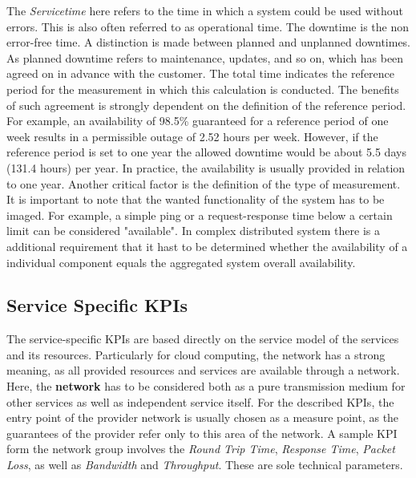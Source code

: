  The \textit{Servicetime} here refers to the time in which a system could be used without errors. This is also often referred to as operational time. The downtime is the non  error-free  time. A distinction is made between planned and unplanned downtimes. As planned downtime refers to maintenance, updates, and so on, which has been agreed on in advance with the customer. The total time indicates the reference period for the measurement in which this calculation is conducted.  The benefits of such agreement is strongly dependent on the definition of the reference period. For example, an availability of 98.5\% guaranteed for a reference period of one week results in a permissible outage of 2.52 hours per week. However, if the reference period is set to one year the allowed downtime would be about 5.5 days (131.4 hours) per year. In practice, the availability is usually provided in relation to one year.  Another critical factor is the definition of the type of measurement. It is important to note that the wanted functionality of the system has to be imaged. For example, a simple ping or a request-response time below a certain limit can be considered "available".  In complex distributed system there is a additional requirement that it hast to be determined whether the availability of a individual component equals the aggregated system overall availability.
 
\subsection{Service Specific KPIs } 
The service-specific KPIs are based directly on the service model of the services and its resources. Particularly for cloud computing, the network has a strong meaning, as all provided resources and services are available through a network. Here, the \textbf{network} has to be considered both as a pure transmission medium for other services as well as independent service itself. For the described KPIs, the entry point of the provider network is usually chosen as a  measure point, as the guarantees of the provider refer only to this area of the network. A sample KPI form the network group involves the \emph{Round Trip Time}, \emph{Response Time}, \emph{Packet Loss}, as well as \emph{Bandwidth} and \emph{Throughput}. These are sole technical parameters.

